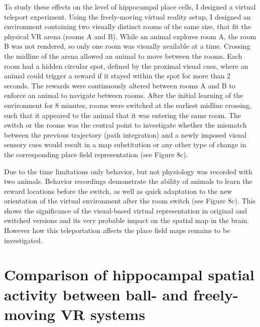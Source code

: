 To study these effects on the level of hippocampal place cells, I designed a virtual teleport experiment. Using the freely-moving virtual reality setup, I designed an environment containing two visually distinct rooms of the same size, that fit the physical VR arena (rooms A and B). While an animal explores room A, the room B was not rendered, so only one room was visually available at a time. Crossing the midline of the arena allowed an animal to move between the rooms. Each room had a hidden circular spot, defined by the proximal visual cues, where an animal could trigger a reward if it stayed within the spot for more than 2 seconds. The rewards were continuously altered between rooms A and B to enforce an animal to navigate between rooms. After the initial learning of the environment for 8 minutes, rooms were switched at the earliest midline crossing, such that it appeared to the animal that it was entering the same room. The switch or the rooms was the central point to investigate whether the mismatch between the previous trajectory (path integration) and a newly imposed visual sensory cues would result in a map substitution or any other type of change in the corresponding place field representation (see Figure 8c).

Due to the time limitations only behavior, but not physiology was recorded with two animals. Behavior recordings demonstrate the ability of animals to learn the reward locations before the switch, as well as quick adaptation to the new orientation of the virtual environment after the room switch (see Figure 8c). This shows the significance of the visual-based virtual representation in original and switched versions and its very probable impact on the spatial map in the brain. However how this teleportation affects the place field maps remains to be investigated.


\section{Comparison of hippocampal spatial activity between ball- and freely-moving VR systems}
\label{sec:comparison_ball_vr}

